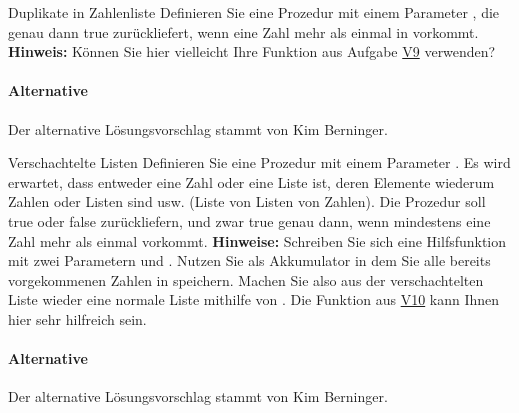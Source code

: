 \documentclass{../preamble}
\begin{document}
\clearpage

\begin{task}[credit = \stars{2}{3}]{Duplikate in Zahlenliste}
	\label{task:V10}
	Definieren Sie eine Prozedur  mit einem Parameter , die genau  dann \textcolor{keywordcolor}{true} zurückliefert, wenn eine Zahl mehr als einmal in  vorkommt.
	\br
	\textbf{Hinweis:} Können Sie hier vielleicht Ihre Funktion aus Aufgabe \hyperref[task:V9]{V9} verwenden?

	\begin{solution}
		

		\paragraph{Alternative}

		Der alternative Lösungsvorschlag stammt von Kim Berninger.
		
	\end{solution}
\end{task}

\clearpage

\begin{task}[credit = \stars{3}{3}]{Verschachtelte Listen}
	Definieren Sie eine Prozedur  mit einem Parameter .  Es wird erwartet, dass  entweder eine Zahl oder eine Liste ist, deren  Elemente wiederum Zahlen oder Listen sind usw. (Liste von Listen von Zahlen). Die Prozedur  soll \textcolor{keywordcolor}{true} oder \textcolor{keywordcolor}{false} zurückliefern, und zwar \textcolor{keywordcolor}{true} genau dann, wenn mindestens eine Zahl mehr als einmal vorkommt.
	\br
	\textbf{Hinweise:} Schreiben Sie sich eine Hilfsfunktion  mit zwei Parametern  und . Nutzen Sie  als Akkumulator in dem Sie alle bereits vorgekommenen Zahlen in  speichern. Machen Sie also aus der verschachtelten Liste wieder eine normale Liste mithilfe von . Die Funktion aus  \hyperref[task:V10]{V10} kann Ihnen hier sehr hilfreich sein.

	\begin{solution}
		

		\clearpage

		\paragraph{Alternative}

		Der alternative Lösungsvorschlag stammt von Kim Berninger.
		
	\end{solution}
\end{task}
\end{document}
